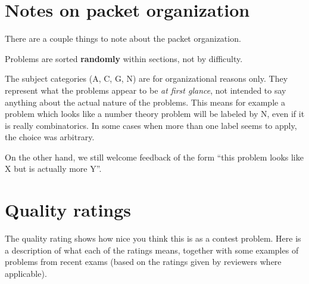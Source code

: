 \newpage

\section{Notes on packet organization}
There are a couple things to note about the packet organization.
\begin{itemize}
  \ii Problems are sorted \textbf{randomly}
  within sections, not by difficulty.

  \ii The subject categories (A, C, G, N)
  are for organizational reasons only.
  They represent what the problems appear
  to be \emph{at first glance},
  not intended to say anything about the
  actual nature of the problems.
  This means for example a problem which looks
  like a number theory problem will be labeled by N,
  even if it is really combinatorics.
  In some cases when more than one label seems to apply,
  the choice was arbitrary.

  On the other hand, we still welcome feedback of the form
  ``this problem looks like X but is actually more Y''.
\end{itemize}

\section{Quality ratings}
The quality rating shows how nice you think this is as a contest problem.
Here is a description of what each of the ratings means,
together with some examples of problems from recent exams
(based on the ratings given by reviewers where applicable).

